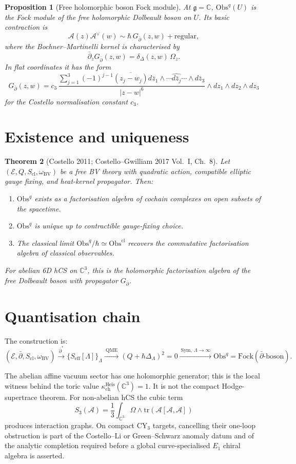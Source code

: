 \documentclass[11pt]{amsart}
\providecommand{\C}{\mathbb{C}}
\providecommand{\dbar}{\bar{\partial}}
\providecommand{\g}{\mathfrak{g}}
\providecommand{\tr}{\mathrm{tr}}
\providecommand{\BV}{\mathrm{BV}}
\providecommand{\QME}{\mathrm{QME}}
\providecommand{\Obs}{\mathrm{Obs}}
\providecommand{\Sym}{\mathrm{Sym}}
\providecommand{\cE}{\mathcal{E}}
\providecommand{\cA}{\mathcal{A}}
\providecommand{\eff}{\mathrm{eff}}
\providecommand{\cl}{\mathrm{cl}}
\theoremstyle{plain}
\newtheorem{theorem}{Theorem}[section]
\newtheorem{proposition}[theorem]{Proposition}
\theoremstyle{definition}
\theoremstyle{remark}
\begin{document}
\begin{proposition}[Free holomorphic boson Fock module]\label{prop:Fock}
At $\g=\C$, $\Obs^q(U)$ is the Fock module of the free holomorphic
Dolbeault boson on $U$. Its basic contraction is
\[
\cA(z)\cA^\vee(w)\sim\hbar\,G_{\dbar}(z,w)+\mathrm{regular},
\]
where the Bochner--Martinelli kernel is characterised by
\[
  \dbar_zG_{\dbar}(z,w)=\delta_\Delta(z,w)\,\Omega_z .
\]
In flat coordinates it has the form
\[
  G_{\dbar}(z,w)
  =
  c_3\,
  \frac{\sum_{j=1}^3(-1)^{j-1}\overline{(z_j-w_j)}
  d\bar z_1\wedge\cdots\widehat{d\bar z_j}\cdots\wedge d\bar z_3}
  {|z-w|^6}
  \wedge dz_1\wedge dz_2\wedge dz_3
\]
for the Costello normalisation constant $c_3$.
\end{proposition}

\section{Existence and uniqueness}

\begin{theorem}[Costello 2011; Costello--Gwilliam 2017 Vol.~I, Ch.~8]
\label{thm:existence}
Let $(\cE,Q,S_\cl,\omega_\BV)$ be a free BV theory with quadratic action,
compatible elliptic gauge fixing, and heat-kernel propagator. Then:
\begin{enumerate}
\item $\Obs^q$ exists as a factorisation algebra of cochain complexes on
open subsets of the spacetime.
\item $\Obs^q$ is unique up to contractible gauge-fixing choice.
\item The classical limit $\Obs^q/\hbar\simeq\Obs^\cl$ recovers the
commutative factorisation algebra of classical observables.
\end{enumerate}
For abelian 6D hCS on $\C^3$, this is the holomorphic factorisation
algebra of the free Dolbeault boson with propagator $G_{\dbar}$.
\end{theorem}

\section{Quantisation chain}

The construction is:
\[
(\cE,\dbar,S_\cl,\omega_\BV)
\xrightarrow{\ \dbar^\ast\ }
\{S_\eff[\Lambda]\}_\Lambda
\xrightarrow{\ \QME\ }
(Q+\hbar\Delta_\Lambda)^2=0
\xrightarrow{\ \Sym,\ \Lambda\to\infty\ }
\Obs^q=\mathrm{Fock}(\dbar\text{-boson}).
\]

The abelian affine vacuum sector has one holomorphic generator; this is
the local witness behind the toric value
$\kappa_{\mathrm{ch}}^{\mathrm{Heis}}(\C^3)=1$. It is not the compact
Hodge-supertrace theorem. For non-abelian hCS the cubic term
\[
  S_3(\cA)=\frac13\int_{\C^3}\Omega\wedge\tr(\cA[\cA,\cA])
\]
produces interaction graphs. On compact CY$_3$ targets, cancelling their
one-loop obstruction is part of the Costello--Li or Green--Schwarz
anomaly datum and of the analytic completion required before a global
curve-specialised $E_1$ chiral algebra is asserted.
\end{document}
